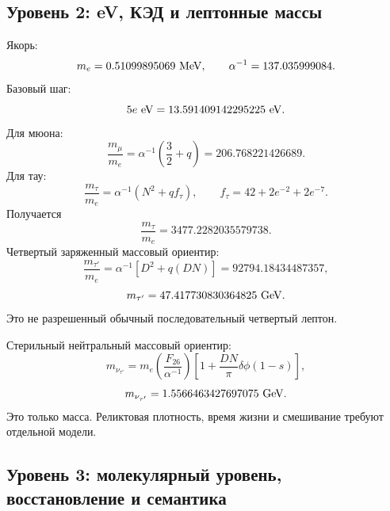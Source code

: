 \documentclass[11pt]{article}
\begin{document}
\subsection{Уровень 2: eV, КЭД и лептонные массы}

Якорь:
\begin{equation}
    m_e=0.51099895069~{\rm MeV},
    \qquad
    \alpha^{-1}=137.035999084.
\end{equation}
Базовый шаг:
\begin{equation}
    5e~{\rm eV}=13.591409142295225~{\rm eV}.
\end{equation}
Для мюона:
\begin{equation}
    \frac{m_\mu}{m_e}
    =
    \alpha^{-1}\left(\frac{3}{2}+q\right)
    =
    206.768221426689.
\end{equation}
Для тау:
\begin{equation}
    \frac{m_\tau}{m_e}
    =
    \alpha^{-1}\left(N^2+qf_\tau\right),
    \qquad
    f_\tau=42+2e^{-2}+2e^{-7}.
\end{equation}
Получается
\begin{equation}
    \frac{m_\tau}{m_e}=3477.2282035579738.
\end{equation}
Четвертый заряженный массовый ориентир:
\begin{equation}
    \frac{m_{\tau'}}{m_e}
    =
    \alpha^{-1}\left[D^2+q(DN)\right]
    =
    92794.18434487357,
\end{equation}
\begin{equation}
    m_{\tau'}=47.417730830364825~{\rm GeV}.
\end{equation}
Это не разрешенный обычный последовательный четвертый лептон.

Стерильный нейтральный массовый ориентир:
\begin{equation}
    m_{\nu_{\tau'}}
    =
    m_e
    \left(\frac{F_{26}}{\alpha^{-1}}\right)
    \left[
        1+\frac{DN}{\pi}\delta\phi(1-s)
    \right],
\end{equation}
\begin{equation}
    m_{\nu_{\tau'}}=1.5566463427697075~{\rm GeV}.
\end{equation}
Это только масса.  Реликтовая плотность, время жизни и смешивание требуют
отдельной модели.

\subsection{Уровень 3: молекулярный уровень, восстановление и семантика}
\end{document}
